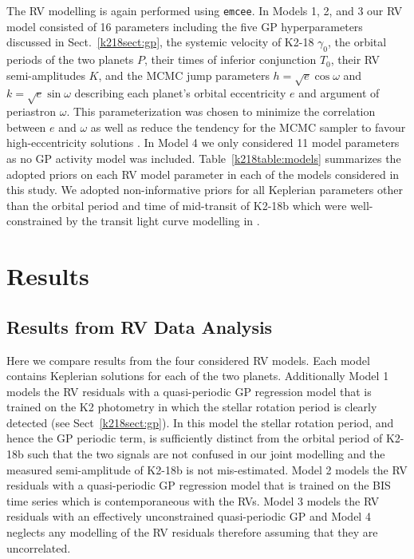 The RV modelling is again performed using \texttt{emcee}. In Models 1, 2, and 3
our RV model consisted of 16 parameters including
the five GP hyperparameters discussed in Sect.~\ref{k218sect:gp}, the systemic velocity of K2-18 $\gamma_0$, the orbital periods
of the two planets $P$, their times of inferior conjunction $T_0$, their RV semi-amplitudes $K$,
and the MCMC jump parameters
$h=\sqrt{e}\cos{\omega}$ and $k=\sqrt{e}\sin{\omega}$ describing each planet's orbital eccentricity $e$
and argument of periastron $\omega$. This parameterization was chosen to minimize the correlation between
$e$ and $\omega$ as well as reduce the tendency for the MCMC sampler to favour high-eccentricity solutions
\citep{ford06}. In Model 4 we only considered 11 model parameters as no GP activity model was included. 
Table~\ref{k218table:models} summarizes the adopted priors on each RV model parameter in each
of the models considered in this study. We adopted non-informative priors for all Keplerian parameters other than the 
orbital period and time of mid-transit of K2-18b which were well-constrained by the transit light curve modelling in 
.





\section{Results} \label{k218sect:results}
\subsection{Results from RV Data Analysis}
Here we compare results from the four considered RV models. Each model contains Keplerian solutions for
each of the two planets. Additionally Model 1 models the RV residuals with a quasi-periodic GP regression model
that is trained on the K2 photometry in which the stellar rotation period is clearly detected
(see Sect~\ref{k218sect:gp}). In this model
the stellar rotation period, and hence the GP periodic term, is sufficiently distinct from the orbital period
of K2-18b such that the two signals are not confused in our joint modelling and the measured semi-amplitude of
K2-18b is not mis-estimated. Model 2 models the RV residuals with a quasi-periodic GP regression
model that is trained on the BIS time series which is contemporaneous with the RVs.
Model 3 models the RV residuals with an effectively unconstrained quasi-periodic GP and Model 4 neglects
any modelling of the RV residuals therefore assuming that they are uncorrelated.

